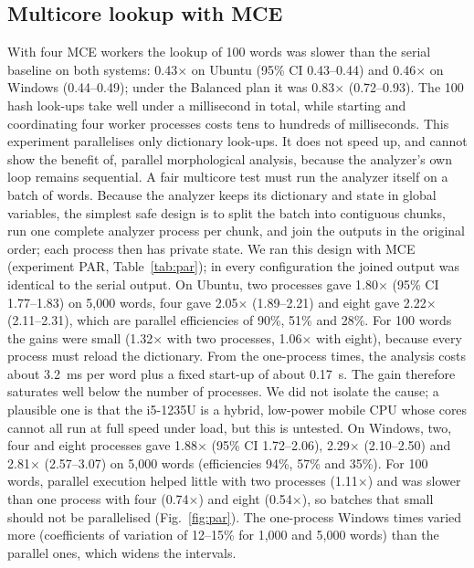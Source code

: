 \documentclass[conference]{IEEEtran}
\begin{document}
\subsection{Multicore lookup with MCE}
With four MCE workers the lookup of 100 words was slower than the serial baseline on both systems: 0.43$\times$ on Ubuntu (95\% CI 0.43--0.44) and 0.46$\times$ on Windows (0.44--0.49); under the Balanced plan it was 0.83$\times$ (0.72--0.93). The 100 hash look-ups take well under a millisecond in total, while starting and coordinating four worker processes costs tens to hundreds of milliseconds. This experiment parallelises only dictionary look-ups. It does not speed up, and cannot show the benefit of, parallel morphological analysis, because the analyzer's own loop remains sequential. A fair multicore test must run the analyzer itself on a batch of words. Because the analyzer keeps its dictionary and state in global variables, the simplest safe design is to split the batch into contiguous chunks, run one complete analyzer process per chunk, and join the outputs in the original order; each process then has private state. We ran this design with MCE (experiment PAR, Table~\ref{tab:par}); in every configuration the joined output was identical to the serial output. On Ubuntu, two processes gave 1.80$\times$ (95\% CI 1.77--1.83) on 5,000 words, four gave 2.05$\times$ (1.89--2.21) and eight gave 2.22$\times$ (2.11--2.31), which are parallel efficiencies of 90\%, 51\% and 28\%. For 100 words the gains were small (1.32$\times$ with two processes, 1.06$\times$ with eight), because every process must reload the dictionary. From the one-process times, the analysis costs about 3.2~ms per word plus a fixed start-up of about 0.17~s. The gain therefore saturates well below the number of processes. We did not isolate the cause; a plausible one is that the i5-1235U is a hybrid, low-power mobile CPU whose cores cannot all run at full speed under load, but this is untested. On Windows, two, four and eight processes gave 1.88$\times$ (95\% CI 1.72--2.06), 2.29$\times$ (2.10--2.50) and 2.81$\times$ (2.57--3.07) on 5,000 words (efficiencies 94\%, 57\% and 35\%). For 100 words, parallel execution helped little with two processes (1.11$\times$) and was slower than one process with four (0.74$\times$) and eight (0.54$\times$), so batches that small should not be parallelised (Fig.~\ref{fig:par}). The one-process Windows times varied more (coefficients of variation of 12--15\% for 1,000 and 5,000 words) than the parallel ones, which widens the intervals.
\end{document}
